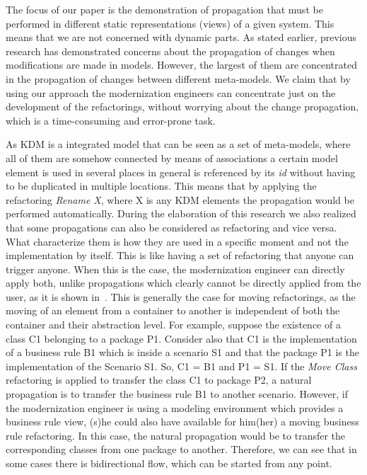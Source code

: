 

The focus of our paper is the demonstration of propagation that must be performed in different static representations (views) of a given system. This means that we are not concerned with dynamic parts. As stated earlier, previous research has demonstrated concerns about the propagation of changes when modifications are made in models. However, the largest of them are concentrated in the propagation of changes between different meta-models. We claim that by using our approach the modernization engineers can concentrate just on the development of the refactorings, without worrying about the change propagation, which is a time-consuming and error-prone task. 

As KDM is a integrated model that can be seen as a set of meta-models, where all of them are somehow connected by means of associations a certain model element is used in several places in general is referenced by its \textit{id} without having to be duplicated in multiple locations. This means that by applying the refactoring \textit{Rename X}, where X is any KDM elements the propagation would be performed automatically. During the elaboration of this research we also realized that some propagations can also be considered as refactoring and vice versa. What characterize them is how they are used in a specific moment and not the implementation by itself. This is like having a set of refactoring that anyone can trigger anyone. When this is the case, the modernization engineer can directly apply both, unlike propagations which clearly cannot be directly applied from the user, as it is shown in~\cite{ICSOFT2014_Winetzhammer}. This is generally the case for moving refactorings, as the moving of an element from a container to another is independent of both the container and their abstraction level. For example, suppose the existence of a class C1 belonging to a package P1. Consider also that C1 is the implementation of a business rule B1 which is inside a scenario S1 and that the package P1 is the implementation of the Scenario S1. So, C1 = B1 and P1 = S1. If the \textit{Move Class} refactoring is applied to transfer the class C1 to package P2, a natural propagation is to transfer the business rule B1 to another scenario. However, if the modernization engineer is using a modeling environment which provides a business rule view, (s)he could also have available for him(her) a moving business rule refactoring. In this case, the natural propagation would be to transfer the corresponding classes from one package to another. Therefore, we can see that in some cases there is bidirectional flow, which can be started from any point.  

